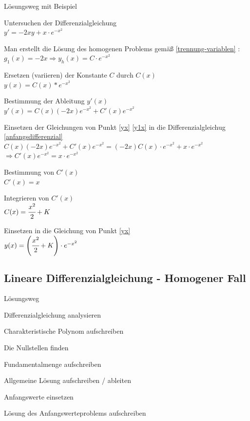 \documentclass[german]{latex4ei/latex4ei_sheet}
\begin{document}
\begin{sectionbox}

\begin{cookbox}{Lösungsweg mit Beispiel}
    \item\label{anfangsdifferenzial} Untersuchen der Differenzialgleichung \\
        $y' = -2xy + x \cdot e^{-x^2}$
    \item Man erstellt die Lösung des homogenen Problems gemäß \ref{trennung-variablen} :\\
        $g_1(x) = -2x \Rightarrow y_h(x) = C \cdot e^{-x^2} $
    \item\label{yx} Ersetzen (variieren) der Konstante $C$ durch $C(x)$ \\
        $y(x) = C(x) * e^{-x^2}$
    \item\label{y1x} Bestimmung der Ableitung $y'(x)$ \\
        $y'(x) = C(x)(-2x)e^{-x^2} + C'(x) e^{-x^2}$
    \item Einsetzen der Gleichungen von Punkt \ref{yx} \ref{y1x} in die Differenzialgleichug \ref{anfangsdifferenzial} \\
        $C(x)(-2x)e^{-x^2} + C'(x)e^{-x^2} = (-2x)C(x)\cdot e^{-x^2} + x \cdot e^{-x^2}$\\
        $\Rightarrow C'(x)e^{-x^2} = x \cdot e^{-x^2}$
    \item Bestimmung von $C'(x)$ \\ $C'(x) = x$
    \item Integrieren von $C'(x)$ \\
        $C(x) = \cfrac{x^2}{2} + K$
    \item Einsetzen in die Gleichung von Punkt \ref{yx} \\
        $y(x) = \left( \cfrac{x^2}{2} + K \right) \cdot e^{-x^2}$
\end{cookbox}

\subsection{Lineare Differenzialgleichung - Homogener Fall}

\begin{cookbox}{Lösungsweg}
    \item Differenzialgleichung analysieren
    \item Charakteristische Polynom aufschreiben
    \item Die Nullstellen finden
    \item Fundamentalmenge aufschreiben
    \item Allgemeine Lösung aufschreiben / ableiten
    \item Anfangswerte einsetzen
    \item Lösung des Anfangswerteproblems aufschreiben
\end{cookbox}



\end{sectionbox}
\end{document}
